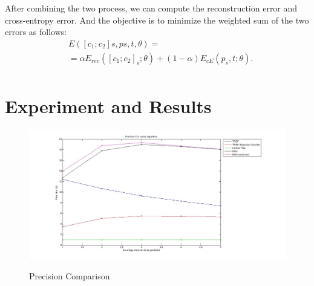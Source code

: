 \documentclass[dvips,12pt]{article}
\begin{document}
After combining the two process, we can compute the reconstruction error and cross-entropy error. And the objective is to minimize the weighted sum of the two errors as follows:
\begin{equation}
\begin{split}
 & E([c_{1}; c_{2}]s, ps, t, θ) = \\
 & = \alpha E_{rec}([c_{1}; c_{2}]_{s}; \theta) + (1 - \alpha)E_{cE}(p_{s}, t; \theta).
\\
 \end{split}
\end{equation}
	\section{Experiment and Results}
		\begin{figure}
			\centering
			\caption{Precision Comparison}
			\includegraphics[scale=0.3]{../baseline/precision.jpg}
            \label{precision}
		\end{figure}
\end{document}
